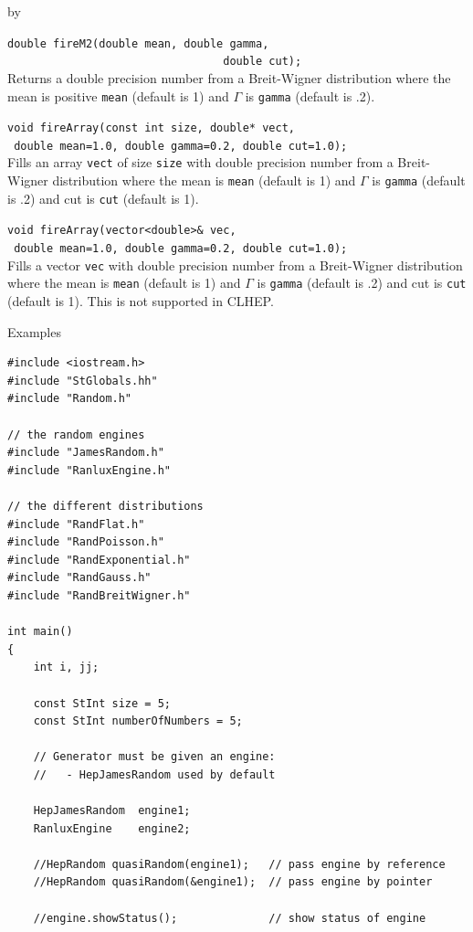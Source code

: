 \documentclass[twoside]{article}
\newcommand{\comp}[1]{\texttt{#1}}%
\newcommand{\entrylabel}[1]{\mbox{\textbf{{#1}}}\hfil}%
\newenvironment{entry}
{\begin{list}{}%
    {\renewcommand{\makelabel}{\entrylabel}%
     \setlength{\labelwidth}{90pt}%
     \setlength{\leftmargin}{\labelwidth}
     \advance\leftmargin by \labelsep%
      }%
    }%
  {\end{list}}
\newcommand{\Entrylabel}[1]%
{\raisebox{0pt}[1ex][0pt]{\makebox[\labelwidth][l]%
    {\parbox[t]{\labelwidth}{\hspace{0pt}\textbf{{#1}}}}}}
\newenvironment{Entry}%
{\renewcommand{\entrylabel}{\Entrylabel}\begin{entry}}%
  {\end{entry}}
\begin{document}
\begin{description}
\begin{Entry}
    \verb+double fireM2(double mean, double gamma,+\\
    \verb+                                 double cut);+\\
    Returns a double precision number from a Breit-Wigner
    distribution where the mean is positive \comp{mean} (default is 1)
    and $\Gamma$ is \comp{gamma} (default is .2).
    
    \verb+void fireArray(const int size, double* vect,+\\
    \verb+ double mean=1.0, double gamma=0.2, double cut=1.0);+\\
     Fills an array \comp{vect} of size \comp{size} with double
    precision number from a Breit-Wigner
    distribution where the mean is \comp{mean} (default is 1)
    and $\Gamma$ is \comp{gamma} (default is .2) and cut is
    \comp{cut} (default is 1).

    \verb+void fireArray(vector<double>& vec,+\\
    \verb+ double mean=1.0, double gamma=0.2, double cut=1.0);+\\
    Fills a vector \comp{vec} with double
    precision number from a Breit-Wigner
    distribution where the mean is \comp{mean} (default is 1)
    and $\Gamma$ is \comp{gamma} (default is .2) and cut is
    \comp{cut} (default is 1).  This is not supported in CLHEP.
    
     
\item[Examples]
{\footnotesize
\begin{verbatim}
#include <iostream.h>
#include "StGlobals.hh"
#include "Random.h"

// the random engines
#include "JamesRandom.h"
#include "RanluxEngine.h"

// the different distributions
#include "RandFlat.h"
#include "RandPoisson.h"
#include "RandExponential.h"
#include "RandGauss.h"
#include "RandBreitWigner.h"

int main()
{
    int i, jj;
    
    const StInt size = 5;
    const StInt numberOfNumbers = 5;
    
    // Generator must be given an engine:
    //   - HepJamesRandom used by default

    HepJamesRandom  engine1;
    RanluxEngine    engine2;
    
    //HepRandom quasiRandom(engine1);   // pass engine by reference
    //HepRandom quasiRandom(&engine1);  // pass engine by pointer

    //engine.showStatus();              // show status of engine
    

\end{verbatim}}
\end{Entry}
\end{description}
\end{document}
